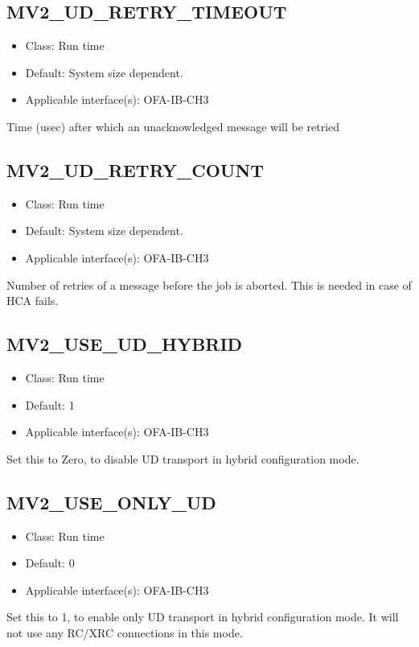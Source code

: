 \subsection{MV2\_UD\_RETRY\_TIMEOUT}
\label{def:ud-rettry-timeout}

\begin{itemize}
        \item Class: Run time
        \item Default: System size dependent.
        \item Applicable interface(s): OFA-IB-CH3
\end{itemize}

Time (usec) after which an unacknowledged message will be retried 

\subsection{MV2\_UD\_RETRY\_COUNT}
\label{def:ud-retry-count}

\begin{itemize}
        \item Class: Run time
        \item Default: System size dependent.
        \item Applicable interface(s): OFA-IB-CH3
\end{itemize}
Number of retries of a message before the job is aborted. This is needed in case of HCA fails. 

\subsection{MV2\_USE\_UD\_HYBRID}
\label{def:use-ud-hybrid}

\begin{itemize}
        \item Class: Run time
        \item Default: 1
        \item Applicable interface(s): OFA-IB-CH3
\end{itemize}
Set this to Zero, to disable UD transport in hybrid configuration mode.

\subsection{MV2\_USE\_ONLY\_UD}
\label{def:use-only-ud}

\begin{itemize}
        \item Class: Run time
        \item Default: 0
        \item Applicable interface(s): OFA-IB-CH3
\end{itemize}
Set this to 1, to enable only UD transport in hybrid configuration mode.
It will not use any RC/XRC connections in this mode.

